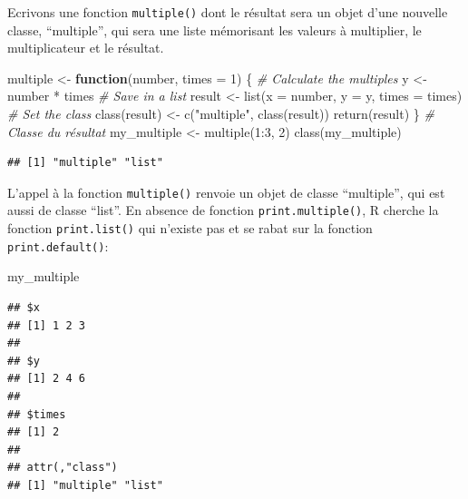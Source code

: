 \documentclass[
  11pt,
  french,
  a4paper,
  extrafontsizes,onecolumn,openright
  ]{memoir}
\newenvironment{Shaded}{\begin{snugshade}}{\end{snugshade}}
\newcommand{\AttributeTok}[1]{\textcolor[rgb]{0.77,0.63,0.00}{#1}}
\newcommand{\CommentTok}[1]{\textcolor[rgb]{0.56,0.35,0.01}{\textit{#1}}}
\newcommand{\ControlFlowTok}[1]{\textcolor[rgb]{0.13,0.29,0.53}{\textbf{#1}}}
\newcommand{\DecValTok}[1]{\textcolor[rgb]{0.00,0.00,0.81}{#1}}
\newcommand{\FunctionTok}[1]{\textcolor[rgb]{0.00,0.00,0.00}{#1}}
\newcommand{\NormalTok}[1]{#1}
\newcommand{\OtherTok}[1]{\textcolor[rgb]{0.56,0.35,0.01}{#1}}
\newcommand{\SpecialCharTok}[1]{\textcolor[rgb]{0.00,0.00,0.00}{#1}}
\newcommand{\StringTok}[1]{\textcolor[rgb]{0.31,0.60,0.02}{#1}}
\begin{document}
Ecrivons une fonction \texttt{multiple()} dont le résultat sera un objet d'une nouvelle classe, ``multiple'', qui sera une liste mémorisant les valeurs à multiplier, le multiplicateur et le résultat.

\scriptsize

\begin{Shaded}
\begin{Highlighting}[]
\NormalTok{multiple }\OtherTok{\textless{}{-}} \ControlFlowTok{function}\NormalTok{(number, }\AttributeTok{times =} \DecValTok{1}\NormalTok{) \{}
    \CommentTok{\# Calculate the multiples}
\NormalTok{    y }\OtherTok{\textless{}{-}}\NormalTok{ number }\SpecialCharTok{*}\NormalTok{ times}
    \CommentTok{\# Save in a list}
\NormalTok{    result }\OtherTok{\textless{}{-}} \FunctionTok{list}\NormalTok{(}\AttributeTok{x =}\NormalTok{ number, }\AttributeTok{y =}\NormalTok{ y, }\AttributeTok{times =}\NormalTok{ times)}
    \CommentTok{\# Set the class}
    \FunctionTok{class}\NormalTok{(result) }\OtherTok{\textless{}{-}} \FunctionTok{c}\NormalTok{(}\StringTok{"multiple"}\NormalTok{, }\FunctionTok{class}\NormalTok{(result))}
    \FunctionTok{return}\NormalTok{(result)}
\NormalTok{\}}
\CommentTok{\# Classe du résultat}
\NormalTok{my\_multiple }\OtherTok{\textless{}{-}} \FunctionTok{multiple}\NormalTok{(}\DecValTok{1}\SpecialCharTok{:}\DecValTok{3}\NormalTok{, }\DecValTok{2}\NormalTok{)}
\FunctionTok{class}\NormalTok{(my\_multiple)}
\end{Highlighting}
\end{Shaded}

\begin{verbatim}
## [1] "multiple" "list"
\end{verbatim}

\normalsize

L'appel à la fonction \texttt{multiple()} renvoie un objet de classe ``multiple'', qui est aussi de classe ``list''.
En absence de fonction \texttt{print.multiple()}, R cherche la fonction \texttt{print.list()} qui n'existe pas et se rabat sur la fonction \texttt{print.default()}:

\scriptsize

\begin{Shaded}
\begin{Highlighting}[]
\NormalTok{my\_multiple}
\end{Highlighting}
\end{Shaded}

\begin{verbatim}
## $x
## [1] 1 2 3
## 
## $y
## [1] 2 4 6
## 
## $times
## [1] 2
## 
## attr(,"class")
## [1] "multiple" "list"
\end{verbatim}
\end{document}
